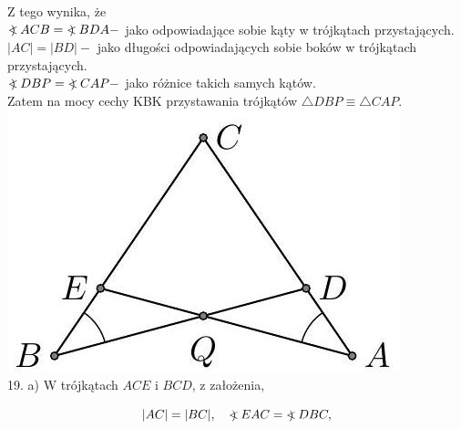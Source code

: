 \documentclass[10pt]{article}
\newcommand\Varangle{\mathop{{<\!\!\!\!\!\text{\small)}}\:}\nolimits}
\begin{document}
Z tego wynika, że\\
\(\Varangle A C B=\Varangle B D A-\) jako odpowiadające sobie kąty w trójkątach przystających.\\
\(|A C|=|B D|-\) jako długości odpowiadających sobie boków w trójkątach przystających.\\
\(\Varangle D B P=\Varangle C A P-\) jako różnice takich samych kątów.\\
Zatem na mocy cechy KBK przystawania trójkątów \(\triangle D B P \equiv \triangle C A P\).\\
\includegraphics[max width=\textwidth, center]{2024_11_21_71f62bd117d375398909g-064}\\
19. a) W trójkątach \(A C E\) i \(B C D\), z założenia,

\[
|A C|=|B C|, \quad \Varangle E A C=\Varangle D B C,
\]
\end{document}
